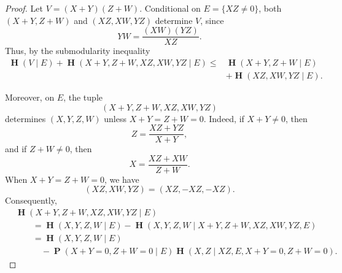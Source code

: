 \documentclass[twoside, 10pt]{article}
\DeclareMathOperator{\Eta}{\mathbf{H}}
\DeclareMathOperator{\pr}{\mathbf{P}}
\newcommand\given{\mathbin{|}}
\begin{document}
\begin{proof}
Let $V=(X+Y)(Z+W)$.
Conditional on $E=\{XZ\ne0\}$, both $(X+Y,Z+W)$ and $(XZ,XW,YZ)$ determine $V$, since
\[
YW=\frac{(XW)(YZ)}{XZ}.
\]
Thus, by the submodularity inequality~\cite{tao2010}
\begin{align} \nonumber
\Eta(V\given E)
+\Eta(X+Y,Z+W,XZ,XW,YZ\given E)
\le{}&
\Eta(X+Y,Z+W\given E)\\ \label{HVgivEbound}
&+\Eta(XZ,XW,YZ\given E).
\end{align}

Moreover, on $E$, the tuple
\[
(X+Y,Z+W,XZ,XW,YZ)
\]
determines $(X,Y,Z,W)$ unless $X+Y=Z+W=0$. Indeed, if $X+Y\ne0$, then
\[
Z=\frac{XZ+YZ}{X+Y},
\]
and if $Z+W\ne0$, then
\[
X=\frac{XZ+XW}{Z+W}.
\]
When $X+Y=Z+W=0$, we have
\[
(XZ,XW,YZ)=(XZ,-XZ,-XZ).
\]
Consequently,
\begin{align} \nonumber
&\Eta(X+Y,Z+W,XZ,XW,YZ\given E)\\ \nonumber &\qquad= \Eta(X,Y,Z,W\given E) -\Eta(X,Y,Z,W\given X+Y,Z+W,XZ,XW,YZ,E)\\ \nonumber &\qquad= \Eta(X,Y,Z,W\given E)\\ \label{Hofalot}  &\qquad\quad- \pr(X+Y=0,Z+W=0\given E) \Eta(X,Z\given XZ,E,X+Y=0,Z+W=0). 
\end{align}


\end{proof}
\end{document}
